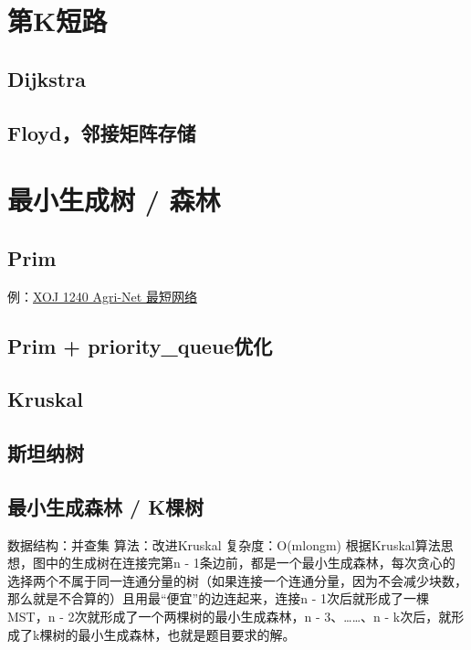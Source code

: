 \section{第K短路}
\subsection{Dijkstra}


\subsection{Floyd，邻接矩阵存储}




\section{最小生成树 / 森林}
\subsection{Prim}
例：\href{https://xoj.red/problems/show/1240}{XOJ 1240 Agri-Net 最短网络}


\subsection{Prim + priority\_queue优化}


\subsection{Kruskal}


\subsection{斯坦纳树}


\subsection{最小生成森林 / K棵树}
数据结构：并查集 算法：改进Kruskal 复杂度：O(mlongm) 
根据Kruskal算法思想，图中的生成树在连接完第n - 1条边前，都是一个最小生成森林，每次贪心的选择两个不属于同一连通分量的树（如果连接一个连通分量，因为不会减少块数，那么就是不合算的）且用最“便宜”的边连起来，连接n - 1次后就形成了一棵MST，n - 2次就形成了一个两棵树的最小生成森林，n - 3、……、n - k次后，就形成了k棵树的最小生成森林，也就是题目要求的解。


